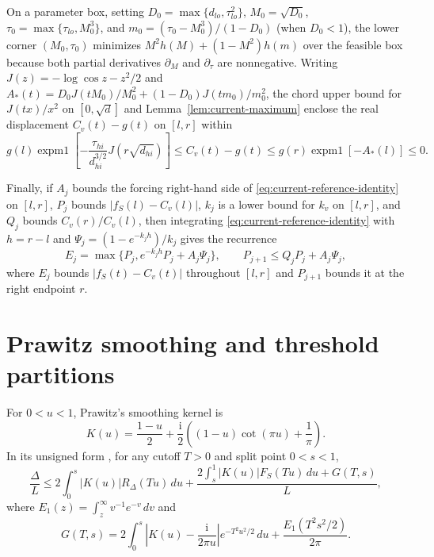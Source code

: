 \documentclass[11pt]{article}
\numberwithin{equation}{section}
\theoremstyle{remark}
\newcommand{\ii}{\mathrm i}
\begin{document}
On a parameter box, setting $D_0=\max\{d_{lo},\tau_{lo}^2\}$,
$M_0=\sqrt{D_0}$, $\tau_0=\max\{\tau_{lo},M_0^3\}$, and
$m_0=(\tau_0-M_0^3)/(1-D_0)$ (when $D_0<1$), the lower corner $(M_0,\tau_0)$
minimizes $M^2h(M)+(1-M^2)h(m)$ over the feasible box because both partial
derivatives $\partial_M$ and $\partial_\tau$ are nonnegative. Writing
$J(z)=-\log\cos z-z^2/2$ and
$A_*(t)=D_0J(tM_0)/M_0^2+(1-D_0)J(tm_0)/m_0^2$, the chord upper bound for
$J(tx)/x^2$ on $[0,\sqrt d]$ and Lemma~\ref{lem:current-maximum} enclose the
real displacement $C_v(t)-g(t)$ on $[l,r]$ within
\begin{equation}\label{eq:current-center-box}
 g(l)\operatorname{expm1}\!\left[-\frac{\tau_{hi}}{d_{hi}^{3/2}}
                       J(r\sqrt{d_{hi}})\right]
 \le C_v(t)-g(t)\le g(r)\operatorname{expm1}[-A_*(l)]\le0.
\end{equation}

Finally, if $A_j$ bounds the forcing right-hand side of
\eqref{eq:current-reference-identity} on $[l,r]$, $P_j$ bounds
$|f_S(l)-C_v(l)|$, $k_j$ is a lower bound for $k_v$ on $[l,r]$, and $Q_j$
bounds $C_v(r)/C_v(l)$, then integrating \eqref{eq:current-reference-identity}
with $h=r-l$ and $\Psi_j=(1-e^{-k_jh})/k_j$ gives the recurrence
\begin{equation}\label{eq:current-radius-recursion}
 E_j=\max\{P_j,e^{-k_jh}P_j+A_j\Psi_j\},\qquad
 P_{j+1}\le Q_jP_j+A_j\Psi_j,
\end{equation}
where $E_j$ bounds $|f_S(t)-C_v(t)|$ throughout $[l,r]$ and $P_{j+1}$ bounds
it at the right endpoint $r$.

\section{Prawitz smoothing and threshold partitions}\label{sec:smoothing}

For $0<u<1$, Prawitz's smoothing kernel is
\[
 K(u)=\frac{1-u}{2}+
 \frac{\ii}{2}\left((1-u)\cot(\pi u)+\frac1\pi\right).
\]
In its unsigned form \citep{Prawitz1972,Tyurin2009,Shevtsova2012}, for any
cutoff $T>0$ and split point $0<s<1$,
\begin{equation}\label{eq:prawitz}
 \frac\Delta L\le
 2\int_0^s|K(u)|R_\Delta(Tu)\,du+
 \frac{2\int_s^1|K(u)|F_S(Tu)\,du+G(T,s)}{L},
\end{equation}
where $E_1(z)=\int_z^\infty v^{-1}e^{-v}\,dv$ and
\begin{equation}\label{eq:gaussian-correction}
 G(T,s)=2\int_0^s\left|K(u)-\frac{\ii}{2\pi u}\right|
          e^{-T^2u^2/2}\,du+\frac{E_1(T^2s^2/2)}{2\pi}.
\end{equation}
\end{document}
